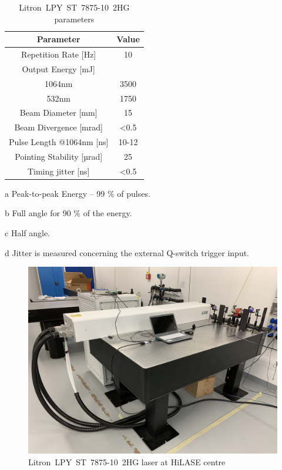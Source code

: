 \begin{table}[h!] 
\centering
    \begin{threeparttable}
        \begin{tabular}{|c | c|} 
        \hline
            \textbf{Parameter} & \textbf{Value} \\ [0.5ex] 
        \hline
        Repetition Rate [Hz] & 10  \\ 
        \hline
            Output Energy [mJ] & \\
            1064nm & 3500 \tnote{a} \\
            532nm & 1750 \\
        \hline
            Beam Diameter [mm] & 15  \\
        \hline
            Beam Divergence [mrad] & \textless 0.5 \tnote{b} \\ 
        \hline
            Pulse Length @1064nm [ns] & 10-12 \\
        \hline
            Pointing Stability [µrad] & 25 \tnote{c} \\
        \hline
            Timing jitter [ns] & \textless 0.5 \tnote{d}  \\
        \hline
        \end{tabular}
        \begin{tablenotes}
            \small
            \item[a] Peak-to-peak Energy -- 99 \% of pulses. 
            \item[b] Full angle for 90 \% of the energy.
            \item[c] Half angle.
            \item[d] Jitter is measured concerning the external Q-switch trigger input.
        \end{tablenotes}
        
    \end{threeparttable}
        \caption[Litron~LPY~ST~7875-10~2HG parameters]{Litron~LPY~ST~7875-10~2HG parameters \protect\cite{litronmanual}}
\label{tab:litronparameters}
\end{table}

\begin{figure}[h]
    \centering
    \includegraphics[width=0.6\linewidth]{img/litron.JPG}
    \caption{Litron~LPY~ST~7875-10~2HG laser at HiLASE centre}
    \label{fig:litron}
\end{figure}





